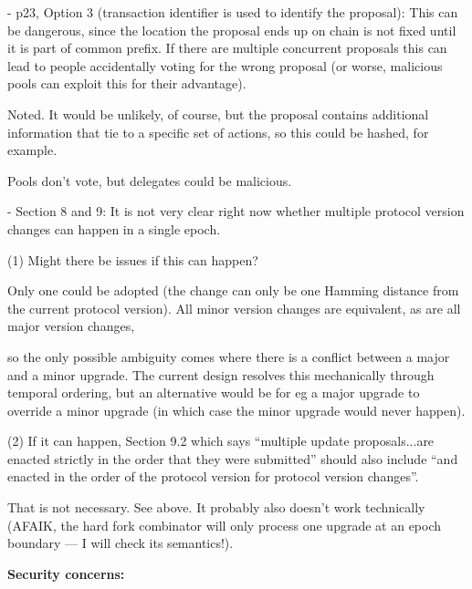 \vspace{12pt}
- p23, Option 3 (transaction identifier is used to identify the proposal): This 
can be dangerous, since the location the proposal ends up on chain is not fixed 
until it is part of common prefix. If there are multiple concurrent proposals this 
can lead to people accidentally voting for the wrong proposal (or worse, malicious 
pools can exploit this for their advantage).

\vspace{12pt}
{\color{color02} Noted.   It would be unlikely, of course, but the proposal contains 
additional information that tie to a specific set of actions, so this could be 
hashed, for example.}

{\color{color02} Pools don't vote, but delegates could be malicious.}

\vspace{12pt}
- Section 8 and 9: It is not very clear right now whether multiple protocol version 
changes can happen in a single epoch.

\parindent=18pt
(1) Might there be issues if this can happen?

\vspace{12pt}
\parindent=0pt
{\color{color02} Only one could be adopted (the change can only be one Hamming 
distance from the current protocol version).  All minor version changes are equivalent, 
as are all major version changes,}

{\color{color02} so the only possible ambiguity comes where there is a conflict 
between a major and a minor upgrade.  The current design resolves this mechanically 
through temporal ordering, but an alternative would be for eg a major upgrade to 
override a minor upgrade (in which case the minor upgrade would never happen).}

\vspace{12pt}
\parindent=18pt
(2) If it can happen, Section 9.2 which says ``multiple update proposals...are 
enacted strictly in the order that they were submitted'' should also include ``and 
enacted in the order of the protocol version for protocol version changes''.

\vspace{12pt}
\parindent=0pt
{\color{color02} That is not necessary.  See above.  It probably also doesn't work 
technically (AFAIK, the hard fork combinator will only process one upgrade at an 
epoch boundary --- I will check its semantics!).}

\vspace{24pt}
\begin{center}
\textbf{Security concerns:}
\end{center}

